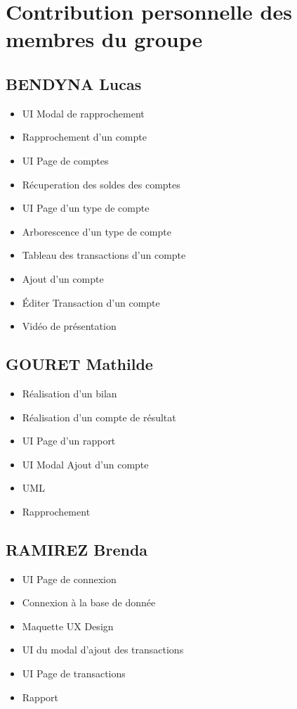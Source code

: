 \documentclass[10pt,a4paper,openany]{report}
\begin{document}
	
	\section{Contribution personnelle des membres du groupe}

	\subsection{BENDYNA Lucas}
	\begin{itemize}
		\item UI Modal de rapprochement
		\item Rapprochement d'un compte
		\item UI Page de comptes
		\item Récuperation des soldes des comptes
		\item UI Page d'un type de compte
		\item Arborescence d'un type de compte
		\item Tableau des transactions d'un compte
		\item Ajout d'un compte
		\item Éditer Transaction d'un compte
		\item Vidéo de présentation	
	\end{itemize}
	\subsection{GOURET Mathilde}
	\begin{itemize}
		\item Réalisation d'un bilan
		\item Réalisation d'un compte de résultat
		\item UI Page d'un rapport
		\item UI Modal Ajout d'un compte
		\item UML 
		\item Rapprochement	
	\end{itemize}
	\subsection{RAMIREZ Brenda}
	\begin{itemize}
		\item UI Page de connexion
		\item Connexion à la base de donnée
		\item Maquette UX Design
		\item UI du modal d'ajout des transactions
		\item UI Page de transactions
		\item Rapport
	\end{itemize}
\end{document}
